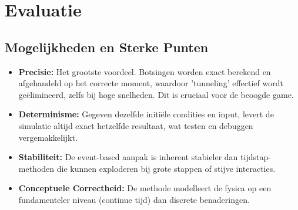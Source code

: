 \documentclass[11pt, a4paper]{article}
\begin{document}
\section{Evaluatie} \label{sec:evaluatie}

\subsection{Mogelijkheden en Sterke Punten}
\begin{itemize}
    \item \textbf{Precisie:} Het grootste voordeel. Botsingen worden exact berekend en afgehandeld op het correcte moment, waardoor 'tunneling' effectief wordt geëlimineerd, zelfs bij hoge snelheden. Dit is cruciaal voor de beoogde game.
    \item \textbf{Determinisme:} Gegeven dezelfde initiële condities en input, levert de simulatie altijd exact hetzelfde resultaat, wat testen en debuggen vergemakkelijkt.
    \item \textbf{Stabiliteit:} De event-based aanpak is inherent stabieler dan tijdstap-methoden die kunnen exploderen bij grote stappen of stijve interacties.
    \item \textbf{Conceptuele Correctheid:} De methode modelleert de fysica op een fundamenteler niveau (continue tijd) dan discrete benaderingen.
\end{itemize}
\end{document}
